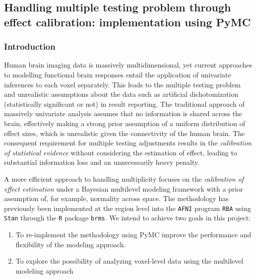 \documentclass[../main.tex]{subfiles}
\begin{document}
\subsection{Handling multiple testing problem through effect calibration: implementation using PyMC}\label{sec:pymc}


\subsubsection{Introduction}

Human brain imaging data is massively multidimensional, yet current approaches to modelling functional brain responses entail the application of univariate inferences to each voxel separately. This leads to the multiple testing problem and unrealistic assumptions about the data such as artificial dichotomization (statistically significant or not) in result reporting. The traditional approach of massively univariate analysis assumes that no information is shared across the brain, effectively making a strong prior assumption of a uniform distribution of effect sizes, which is unrealistic given the connectivity of the human brain. The consequent requirement for multiple testing adjustments results in the \textit{calibration of statistical evidence} without considering the estimation of effect, leading to substantial information loss and an unnecessarily heavy penalty.

A more efficient approach to handling multiplicity focuses on the \textit{calibration of effect estimation} under a Bayesian multilevel modeling framework with a prior assumption of, for example, normality across space\supercite{chenHandlingMultiplicityNeuroimaging2019}. The methodology has previously been implemented at the region level into the \texttt{AFNI} program \texttt{RBA}\supercite{chen_sources_2022} using \texttt{Stan} through the \texttt{R} package \texttt{brms}\supercite{burknerBrmsPackageBayesian2017}. We intend to achieve two goals in this project: 
\begin{enumerate}[label=(\roman*),nolistsep]
    \item To re-implement the methodology using PyMC improve the performance and flexibility of the modeling approach.
    \item To explore the possibility of analyzing voxel-level data using the multilevel modeling approach
\end{enumerate}
\end{document}
